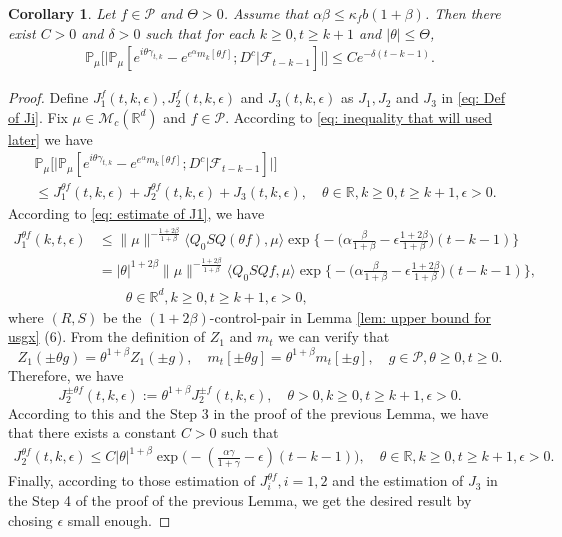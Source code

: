 \documentclass[12pt]{amsart}
\theoremstyle{plain}
\newtheorem{cor}[thm]{Corollary}
\theoremstyle{definition}
\numberwithin{equation}{section}
\begin{document}
\begin{cor}\label{cor: used in next corollary}
Let $f\in \mathcal{P}$ and $\Theta >0$.
Assume that $\alpha\beta\leq \kappa_fb(1+\beta)$.
Then there exist $C>0$ and $\delta>0$ such that for each $k \geq 0, t\geq k+1$ and $|\theta|\leq \Theta$,
\begin{align}
    \mathbb{P}_{\mu}\Big[\big|\mathbb{P}_{\mu}[e^{i\theta\gamma_{t,k}}-e^{e^{\alpha}m_k[\theta f]}; D^c | \mathscr F_{t-k-1}]\big|\Big]\leq Ce^{-\delta(t-k-1)}.
\end{align}
\end{cor}
\begin{proof}
	Define $J_1^f(t,k,\epsilon), J_2^f(t,k,\epsilon)$ and $J_3(t,k,\epsilon)$ as $J_1, J_2$ and $J_3$ in \eqref{eq: Def of Ji}.
	Fix $\mu \in \mathcal M_c(\mathbb R^d)$ and $f\in \mathcal P$.
    According to \eqref{eq: inequality that will used later} we have
\begin{align}
    &\mathbb{P}_{\mu}\Big[\big| \mathbb{P}_{\mu}[e^{i\theta \gamma_{t,k}}-e^{e^{\alpha}m_k[\theta f]}; D^c | \mathscr F_{t-k-1}]\big|\Big]
    \\&\leq J^{\theta f}_1(t,k,\epsilon) + J^{\theta f}_2(t,k,\epsilon)+J_3(t,k,\epsilon),
    \quad \theta\in \mathbb R, k\geq 0, t\geq k+1, \epsilon> 0.
\end{align}
	According to \eqref{eq: estimate of J1}, we have
\begin{align}
	J^{\theta f}_1(k,t,\epsilon)
     & \leq \|\mu\|^{-\frac{1+2\beta}{1+\beta}} \langle Q_0 SQ (\theta f), \mu \rangle \exp\Big\{-\Big(\alpha\frac{\beta}{1+\beta}-\epsilon\frac{1+2\beta}{1+\beta}\Big)(t-k-1)\Big\}
     \\& = |\theta|^{1+2\beta} \|\mu\|^{-\frac{1+2\beta}{1+\beta}} \langle Q_0 SQf, \mu \rangle \exp\Big\{-\Big(\alpha\frac{\beta}{1+\beta}-\epsilon\frac{1+2\beta}{1+\beta}\Big)(t-k-1)\Big\},
     \\ &\qquad \theta \in \mathbb R^d, k\geq 0, t\geq k+1, \epsilon > 0,
\end{align}
	where $(R,S)$ be the $(1+2\beta)$-control-pair in Lemma \ref{lem: upper bound for usgx} (6).
	From the definition of $Z_1$ and $m_t$ we can verify that
\[
	Z_1( \pm \theta g) = \theta^{1+\beta} Z_1(\pm g), \quad m_t[\pm \theta g] = \theta^{1+\beta} m_t[\pm g],\quad g\in \mathcal P, \theta \geq 0, t\geq 0.
\]
	Therefore, we have
\[
J^{\pm \theta f}_2(t,k,\epsilon)
	:= \theta^{1+\beta} J_2^{\pm f}(t,k,\epsilon), \quad \theta >0, k \geq 0, t\geq k+1, \epsilon > 0.
\]
	According to this and the Step 3 in the proof of the previous Lemma, we have that there exists a constant $C > 0$ such that
\begin{align}
\label{eq:31step3}
    J^{\theta f}_2(t,k,\epsilon)
    \leq C |\theta|^{1+\beta}\exp\Big(-(\frac{\alpha\gamma}{1+\gamma}-\epsilon)(t-k-1)\Big),
    \quad \theta \in \mathbb R, k\geq 0, t\geq k+1, \epsilon >0.
\end{align}
	Finally, according to those estimation of $J^{\theta f}_{i}, i = 1,2$ and the estimation of $J_3$ in the Step 4 of the proof of the previous Lemma, we get the desired result by chosing $\epsilon$ small enough.
\end{proof}
\end{document}
